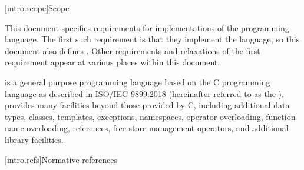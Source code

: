
[intro.scope]{Scope}

\pnum
{}%
This document specifies requirements for implementations
of the \Cpp{} programming language. The first such requirement is that
they implement the language, so this document also
defines \Cpp{}. Other requirements and relaxations of the first
requirement appear at various places within this document.

\pnum
\Cpp{} is a general purpose programming language based on the C
programming language as described in ISO/IEC 9899:2018
 (hereinafter referred to as the
). \Cpp{} provides many facilities
beyond those provided by C, including additional data types,
classes, templates, exceptions, namespaces, operator
overloading, function name overloading, references, free store
management operators, and additional library facilities.%

[intro.refs]{Normative references}%
%

